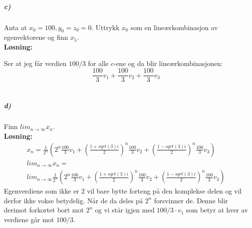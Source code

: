 \documentclass[11pt, A4paper,norsk]{article}
\begin{document}
			\subparagraph{c)}
				\begin{flushleft}
Anta at $x_0 = 100, y_0 = z_0 = 0$. Uttrykk $x_0$ som en lineærkombinasjon av egenvektorene og finn $x_5$.\\
\vspace{1mm}
\textbf{Løsning:} \\
\vspace{1mm}

Ser at jeg får verdien $100/3$ for alle $c$-ene og da blir lineærkombinasjonen:
$$\frac{100}{3}v_1 + \frac{100}{3}v_2 + \frac{100}{3}v_3$$ \nonumber \\
				\end{flushleft}












			\subparagraph{d)}
				\begin{flushleft}
Finn $lim_{n \rightarrow \infty} x_n$. \\
\vspace{1mm}
\textbf{Løsning:} \\
\vspace{1mm}
					\begin{align}
x_n = \frac{1}{2^n}(2^n\frac{100}{3}v_1 + (\frac{1 + sqrt(3)i}{2})^n \frac{100}{3}v_2 + (\frac{1 - sqrt(3)i}{2})^n \frac{100}{3}v_3) \nonumber \\
lim_{n \rightarrow \infty} x_n = \nonumber \\
lim_{n \rightarrow \infty} \frac{1}{2^n}(2^n\frac{100}{3}v_1 + (\frac{1 + sqrt(3)i}{2})^n \frac{100}{3}v_2 + (\frac{1 - sqrt(3)i}{2})^n \frac{100}{3}v_3) \nonumber
					\end{align}
Egenverdiene som ikke er $2$ vil bare bytte forteng på den komplekse delen og vil derfor ikke vokse betydelig. Når de da deles på $2^n$ forsvinner de. Denne blir derimot forkortet bort mot $2^n$ og vi står igjen med $100/3 \cdot v_1$ som betyr at hver av verdiene går mot $100/3$.
				\end{flushleft}
\end{document}
